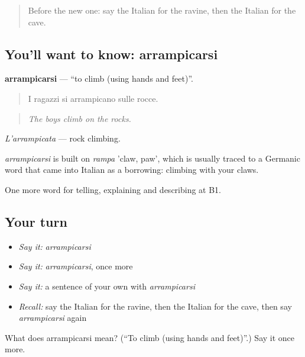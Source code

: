 \label{lesson:IT-C462-arrampicarsi}



\begin{quote}
Before the new one: say the Italian for the ravine, then the Italian for the cave.
\end{quote}

\subsection*{You'll want to know: arrampicarsi}
\textbf{arrampicarsi} — \textquotedblleft{}to climb (using hands and feet)\textquotedblright{}.

\begin{quote}
I ragazzi si arrampicano sulle rocce.
\end{quote}

\begin{quote}
\emph{The boys climb on the rocks.}
\end{quote}

\emph{L'arrampicata} — rock climbing.

\begin{cousinweb}
\emph{arrampicarsi} is built on \emph{rampa} 'claw, paw', which is usually traced to a Germanic word that came into Italian as a borrowing: climbing with your claws.
\end{cousinweb}

\begin{grammarlens}[title={What you've built}]
One more word for telling, explaining and describing at B1.
\end{grammarlens}

\subsection*{Your turn}
\begin{itemize}
\raggedright
  \item \emph{Say it:} \emph{arrampicarsi}
  \item \emph{Say it:} \emph{arrampicarsi}, once more
  \item \emph{Say it:} a sentence of your own with \emph{arrampicarsi}
  \item \emph{Recall:} say the Italian for the ravine, then the Italian for the cave, then say \emph{arrampicarsi} again
\end{itemize}

\begin{tcolorbox}[breakable,colback=teal!4,colframe=teal!35!black,title={Before you move on}]
What does arrampicarsi mean? (\textquotedblleft{}To climb (using hands and feet)\textquotedblright{}.) Say it once more.
\end{tcolorbox}
